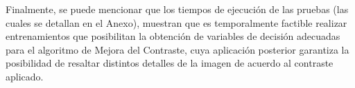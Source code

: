 Finalmente, se puede mencionar que los tiempos de ejecución de las pruebas (las cuales se detallan en el Anexo), muestran que es temporalmente factible realizar entrenamientos que posibilitan la obtención de variables de decisión adecuadas para el algoritmo de Mejora del Contraste, cuya aplicación posterior garantiza la posibilidad de resaltar distintos detalles de la imagen de acuerdo al contraste aplicado.





